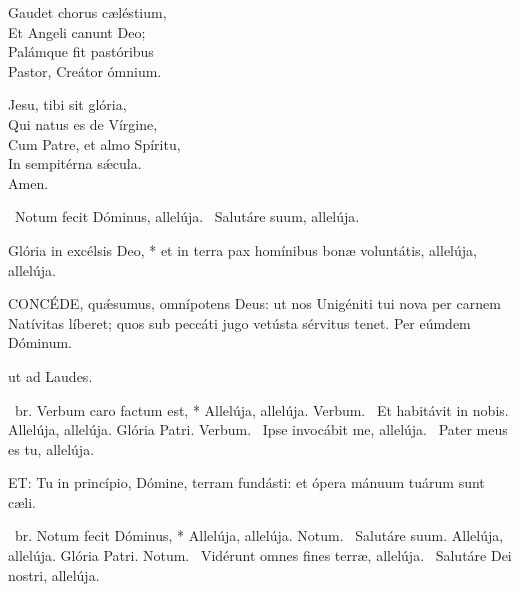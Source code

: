Gaudet chorus cæléstium,\\
Et Angeli canunt Deo;\\
Palámque fit pastóribus\\
Pastor, Creátor ómnium.

Jesu, tibi sit glória,\\
Qui natus es de Vírgine,\\
Cum Patre, et almo Spíritu,\\
In sempitérna sǽcula.\\
Amen.

\V\ Notum fecit Dóminus, allelúja. \R\ Salutáre suum, allelúja.

 Glória in excélsis Deo, * et in terra pax homínibus bonæ voluntátis, allelúja, allelúja.


\lettrine[lines=2]{C}{ONCÉDE}, quǽsumus, omnípotens Deus: ut nos Unigéniti tui nova per carnem Natívitas líberet; quos sub peccáti jugo vetústa sérvitus tenet. Per eúmdem Dóminum.






 ut ad Laudes.

\R\ br. Verbum caro factum est, * Allelúja, allelúja. Verbum. \V\ Et habitávit in nobis. Allelúja, allelúja. Glória Patri. Verbum. \V\ Ipse invocábit me, allelúja. \R\ Pater meus es tu, allelúja.



\lettrine[lines=2]{E}{T}: Tu in princípio, Dómine, terram fundásti: et ópera mánuum tuárum sunt cæli.

\R\ br. Notum fecit Dóminus, * Allelúja, allelúja. Notum. \V\ Salutáre suum. Allelúja, allelúja. Glória Patri. Notum. \V\ Vidérunt omnes fines terræ, allelúja. \R\ Salutáre Dei nostri, allelúja.

